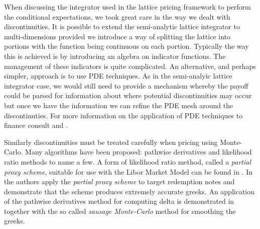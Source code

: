 When discussing the integrator used in the lattice pricing framework
to perform the conditional expectations, we took great care in the way
we dealt with discontinuities. It is possible to extend the
semi-analytic lattice integrator to multi-dimensions provided we
introduce a way of splitting the lattice into portions with the
function being continuous on each portion. Typically the way this is
achieved is by introducing an algebra on indicator functions. The
management of these indicators is quite complicated. An alternative,
and perhaps simpler, approach is to use PDE techniques. As in the
semi-analyic lattice integrator case, we would still need to provide a
mechanism whereby the payoff could be parsed for information about
where potential discontinuities may occur but once we have the
information we can refine the PDE mesh around the discontinuties. For
more information on the application of PDE techniques to finance
consult \cite{book:DJDUFFY} and \cite{book:KOHLLANDGRAF}.

Similarly discontinuities must be treated carefully when pricing using
Monte-Carlo. Many algorithms have been proposed: pathwise derivatives
and likelihood ratio methods to name a few. A form of likelihood ratio
method, called a \textit{partial proxy scheme}, suitable for use with
the Libor Market Model can be found in \cite{article:FRIES07}. In
\cite{article:FRIES06} the authors apply the \textit{partial proxy
scheme} to target redemption notes and demonstrate that the
scheme produces extremely accurate greeks. An application of the
pathwise derivatives method for computing delta is demonstrated in
\cite{article:PITERBARG03} together with the so called \textit{sausage
Monte-Carlo} method for smoothing the greeks.
